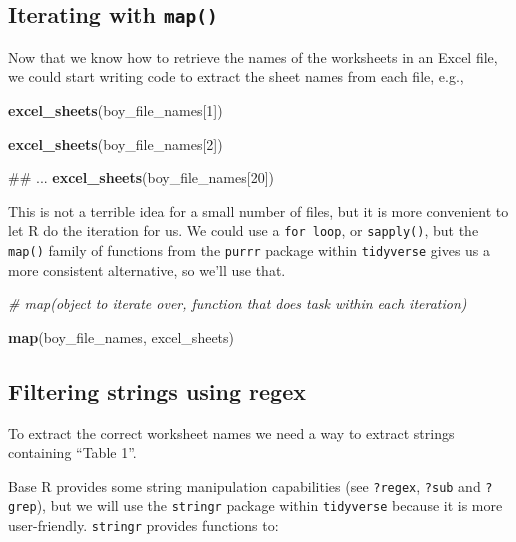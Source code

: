 \documentclass[]{book}
\newenvironment{Shaded}{\begin{snugshade}}{\end{snugshade}}
\newcommand{\KeywordTok}[1]{\textcolor[rgb]{0.13,0.29,0.53}{\textbf{#1}}}
\newcommand{\DecValTok}[1]{\textcolor[rgb]{0.00,0.00,0.81}{#1}}
\newcommand{\CommentTok}[1]{\textcolor[rgb]{0.56,0.35,0.01}{\textit{#1}}}
\newcommand{\NormalTok}[1]{#1}
\begin{document}
\subsection{\texorpdfstring{Iterating with
\texttt{map()}}{Iterating with map()}}\label{iterating-with-map}

Now that we know how to retrieve the names of the worksheets in an Excel
file, we could start writing code to extract the sheet names from each
file, e.g.,

\begin{Shaded}
\begin{Highlighting}[]
\KeywordTok{excel_sheets}\NormalTok{(boy_file_names[}\DecValTok{1}\NormalTok{])}

\KeywordTok{excel_sheets}\NormalTok{(boy_file_names[}\DecValTok{2}\NormalTok{])}

\NormalTok{## ...}
\KeywordTok{excel_sheets}\NormalTok{(boy_file_names[}\DecValTok{20}\NormalTok{])}
\end{Highlighting}
\end{Shaded}

This is not a terrible idea for a small number of files, but it is more
convenient to let R do the iteration for us. We could use a
\texttt{for\ loop}, or \texttt{sapply()}, but the \texttt{map()} family
of functions from the \texttt{purrr} package within \texttt{tidyverse}
gives us a more consistent alternative, so we'll use that.

\begin{Shaded}
\begin{Highlighting}[]
\CommentTok{# map(object to iterate over, function that does task within each iteration)}

\KeywordTok{map}\NormalTok{(boy_file_names, excel_sheets)}
\end{Highlighting}
\end{Shaded}

\subsection{Filtering strings using
regex}\label{filtering-strings-using-regex}

To extract the correct worksheet names we need a way to extract strings
containing ``Table 1''.

Base R provides some string manipulation capabilities (see
\texttt{?regex}, \texttt{?sub} and \texttt{?grep}), but we will use the
\texttt{stringr} package within \texttt{tidyverse} because it is more
user-friendly. \texttt{stringr} provides functions to:
\end{document}
